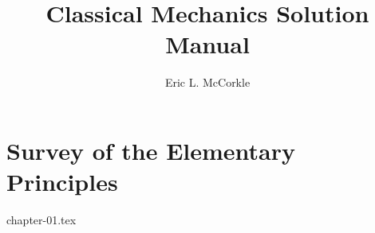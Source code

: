 \documentclass{report}
\title{Classical Mechanics Solution Manual}
\author{Eric L. McCorkle}
\begin{document}
\maketitle
\tableofcontents

\chapter{Survey of the Elementary Principles}
{chapter-01.tex}
\end{document}
